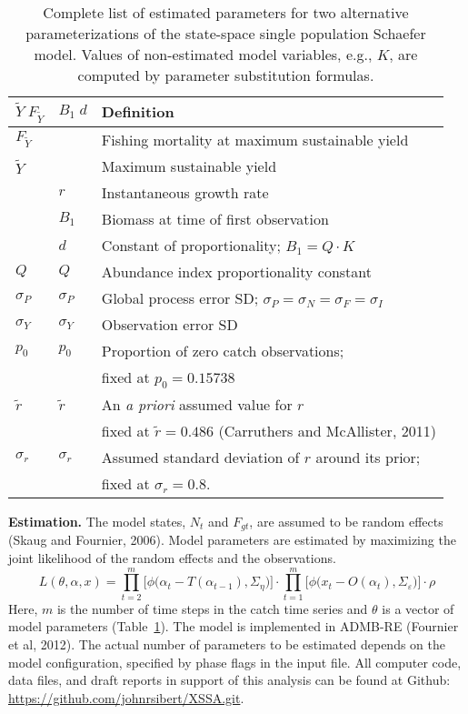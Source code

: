 \documentclass[12pt,letterpaper,twoside]{article}
\newcommand\MSY{\widetilde{Y}}
\newcommand\Fmsy{F_{\MSY}}
\begin{document}
\begin{table}
\caption{Complete list of estimated parameters for two alternative
parameterizations of the state-space single population Schaefer model.
Values of non-estimated model variables, e.g., $K$, are computed by
parameter substitution formulas.}
\label{tab:allvars1}
\begin{center}
\begin{tabular}{lll}
\hline
$\MSY\;\Fmsy$ & $B_1\;d$ & Definition\\
\hline
\hline
$\Fmsy$&  & Fishing mortality at maximum sustainable yield\\
$\MSY$ &  & Maximum sustainable yield\\
    & $r$ & Instantaneous growth rate\\
    & $B_1$ & Biomass at time of first observation\\
    &  $d $ & Constant of proportionality; $B_1=Q\cdot K$\\
$Q$ & $Q$ & Abundance index proportionality constant\\
$\sigma_P$ & $\sigma_P$ & Global process error SD; $\sigma_P=\sigma_N=\sigma_F=\sigma_I$\\
$\sigma_Y$ & $\sigma_Y$ & Observation error SD \\
\hline
$p_0$ & $p_0$ & Proportion of zero catch observations;\\
      &       & fixed at $p_0 = 0.15738$\\
$\tilde{r}$ & $\tilde{r}$ & An {\it a priori} assumed value for $r$\\
            &             & fixed at $\tilde{r}=0.486$ (Carruthers and McAllister, 2011)\\
$\sigma_r$  & $\sigma_r$  & Assumed standard deviation of $r$ around its prior;\\
            &             & fixed at $\sigma_r=0.8$.\\
\hline
\end{tabular}
\end{center}
\end{table}



{\bf Estimation.} The model states, $N_t$ and $F_{gt}$, are assumed to be random
effects (Skaug and Fournier, 2006). Model parameters are estimated by
maximizing the joint likelihood of the random
effects and the observations.
\begin{equation}
\label{eqn:likelihood}
L(\theta,\alpha,x)=
\prod^m_{t=2}\big[\phi\big(\alpha_t-T(\alpha_{t-1}), \Sigma_\eta\big)\big]\cdot
\prod^m_{t=1}\big[\phi\big(x_t-O(\alpha_t),
\Sigma_\varepsilon\big)\big]\cdot\rho
\end{equation}
Here, $m$ is the number of time steps in the catch time series and
$\theta$ is a vector of model parameters (Table~\ref{tab:allvars1}).
The model is implemented in ADMB-RE (Fournier et al, 2012).
The actual number of
parameters to be estimated depends on the model configuration,
specified by phase flags in the input file. 
All computer code, data files, and draft reports in support of this
analysis can be found at Github:
\url{https://github.com/johnrsibert/XSSA.git}.



\clearpage

\end{document}
